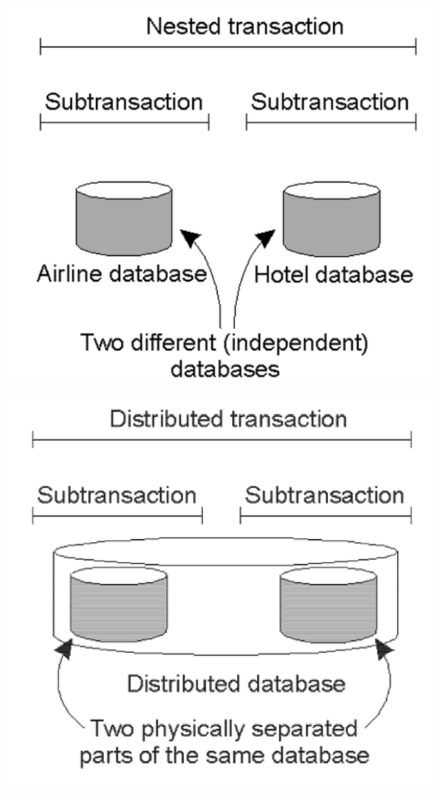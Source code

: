 \documentclass[10pt,a4paper]{article}
\begin{document}
\begin{figure}[h!]
\centering
\begin{minipage}{.5\textwidth}
  \includegraphics[width=.6\linewidth]{images/nested.png}
  \label{fig:nested}
\end{minipage}%
\begin{minipage}{.5\textwidth}
  \includegraphics[width=.6\linewidth]{images/distributed.png}
  \label{fig:distributed}
\end{minipage}
\end{figure} 
\end{document}
